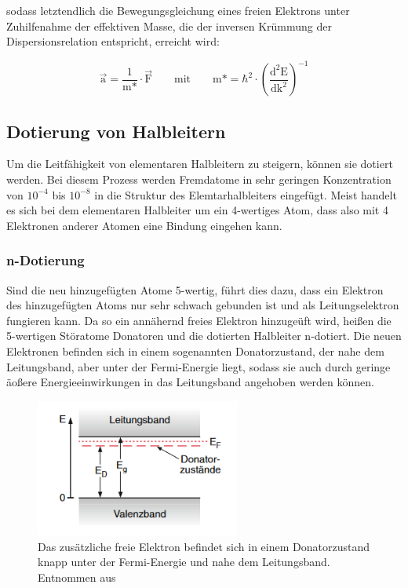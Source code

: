         sodass letztendlich die Bewegungsgleichung eines freien Elektrons unter Zuhilfenahme der effektiven Masse, die der inversen Krümmung der Dispersionsrelation entspricht, erreicht wird:

        \begin{equation*}
            \vec{\text{a}} = \frac{\text{1}}{\text{m*}} \cdot \vec{\text{F}} \qquad \text{mit} \qquad \text{m*} = \hbar^2 \cdot \left(\frac{\text{d}^2\text{E}}{\text{dk}^2}\right)^{-1}
            \label{eqn:eff_masse}
        \end{equation*}


    \subsection{Dotierung von Halbleitern}
        Um die Leitfähigkeit von elementaren Halbleitern zu steigern, können sie dotiert werden. Bei diesem Prozess werden Fremdatome in sehr geringen Konzentration von $10^{-4}$ bis $10^{-8}$ in die Struktur
        des Elemtarhalbleiters eingefügt. Meist handelt es sich bei dem elementaren Halbleiter um ein 4-wertiges Atom, dass also mit 4 Elektronen anderer Atomen eine Bindung eingehen kann. 
        
            \subsubsection*{n-Dotierung}
             Sind die neu hinzugefügten Atome 5-wertig, führt dies dazu, dass ein Elektron des hinzugefügten Atoms nur sehr schwach gebunden ist und als Leitungselektron fungieren kann. Da so ein annähernd 
             freies Elektron hinzugeüft wird, heißen die 5-wertigen Störatome Donatoren und die dotierten Halbleiter n-dotiert. Die neuen Elektronen befinden sich in einem sogenannten Donatorzustand, der nahe 
             dem Leitungsband, aber unter der Fermi-Energie liegt, sodass sie auch durch geringe äoßere Energieeinwirkungen in das Leitungsband angehoben werden können.
            
             \FloatBarrier

             \begin{figure}[h]
                \centering
                \includegraphics[width = 0.6\textwidth]{pictures/donator.png}
                \caption{Das zusätzliche freie Elektron befindet sich in einem Donatorzustand knapp unter der Fermi-Energie und nahe dem Leitungsband. Entnommen aus \cite{demtroder_atome_2016}}
                \label{fig:Donator}
             \end{figure}
     
